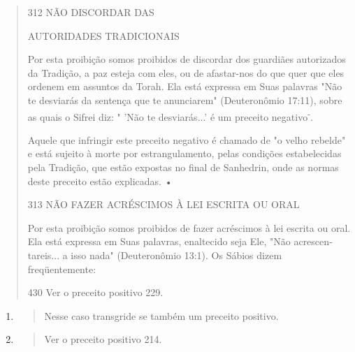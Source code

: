 \begin{quote}
312 NÃO DISCORDAR DAS

AUTORIDADES TRADICIONAIS

Por esta proibição somos proibidos de discordar dos guardiães
au­torizados da Tradição, a paz esteja com eles, ou de afastar-nos do
que quer que eles ordenem em assuntos da Torah. Ela está expressa em
Suas palavras "Não te desviarás da sentença que te anunciarem"
(Deuteronômio 17:11), sobre as quais o Sifrei diz: " 'Não te
desviarás...' é um preceito negativo\textsuperscript{-}.

Aquele que infringir este preceito negativo é chamado de "o velho
rebelde" e está sujeito à morte por estrangulamento, pelas condições
estabele­cidas pela Tradição, que estão expostas no final de Sanhedrin,
onde as normas deste preceito estão explicadas. •

313 NÃO FAZER ACRÉSCIMOS À LEI ESCRITA OU ORAL

Por esta proibição somos proibidos de fazer acréscimos à lei escrita ou
oral. Ela está expressa em Suas palavras, enaltecido seja Ele, "Não
acrescen­tareis... a isso nada" (Deuteronômio 13:1). Os Sábios dizem
freqüentemente:

430 Ver o preceito positivo 229.
\end{quote}

\begin{enumerate}
\def\labelenumi{\arabic{enumi}.}
\setcounter{enumi}{430}
\item
  \begin{quote}
  Nesse caso transgride se também um preceito positivo.
  \end{quote}
\item
  \begin{quote}
  Ver o preceito positivo 214.
  \end{quote}
\end{enumerate}

